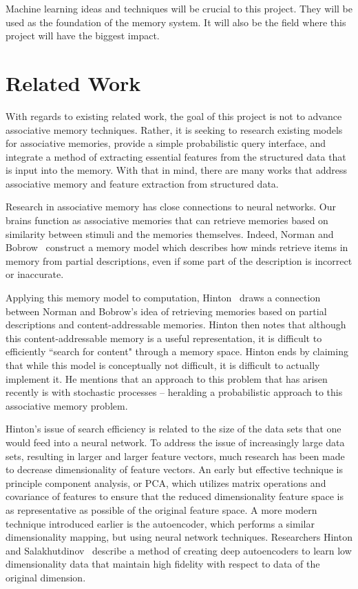 \documentclass{sig-alternate}
\begin{document}
Machine learning ideas and techniques will be crucial to this project. 
They will be used as the foundation of the memory system. It will also be the field where this 
project will have the biggest impact.


\section{Related Work}
\label{sec:related_work}

With regards to existing related work, the goal of this project is not to advance associative memory 
techniques. Rather, it is seeking to research existing models for associative memories, provide a 
simple probabilistic query interface, and integrate a method of extracting essential features from 
the structured data that is input into the memory. With that in mind, there are many works that 
address associative memory and feature extraction from structured data.

Research in associative memory has close connections to neural networks. Our brains function as 
associative memories that can retrieve memories based on similarity between stimuli and the memories 
themselves.  Indeed, Norman and Bobrow~\cite{bobrow} construct a memory model which describes how 
minds retrieve items in memory from partial descriptions, even if some part of the description is 
incorrect or inaccurate. 

Applying this memory model to computation, Hinton~\cite{hinton} draws a connection between Norman 
and Bobrow's idea of retrieving memories based on partial descriptions and content-addressable 
memories.  Hinton then notes that although this content-addressable memory is a useful 
representation, it is difficult to efficiently ``search for content" through a memory space. 
Hinton ends by claiming that while this model is conceptually not difficult, it is difficult to 
actually implement it. He mentions that an approach to this problem that has arisen recently is with 
stochastic processes -- heralding a probabilistic approach to this associative memory problem.

Hinton's issue of search efficiency is related to the size of the data sets that
one would feed into a neural network.  To address the issue of increasingly large data sets, 
resulting in larger and larger feature vectors, much research has been made to decrease 
dimensionality of feature vectors. An early but effective technique is principle component
analysis, or PCA, which utilizes matrix operations and covariance of features to ensure
that the reduced dimensionality feature space is as representative as possible of the original
feature space. A more modern technique introduced earlier is the autoencoder, which performs a
similar dimensionality mapping, but using neural network techniques. Researchers Hinton 
and Salakhutdinov~\cite{autoencoder} describe a method of creating deep autoencoders to learn low 
dimensionality data that maintain high fidelity with respect to data of the original dimension.
\end{document}
